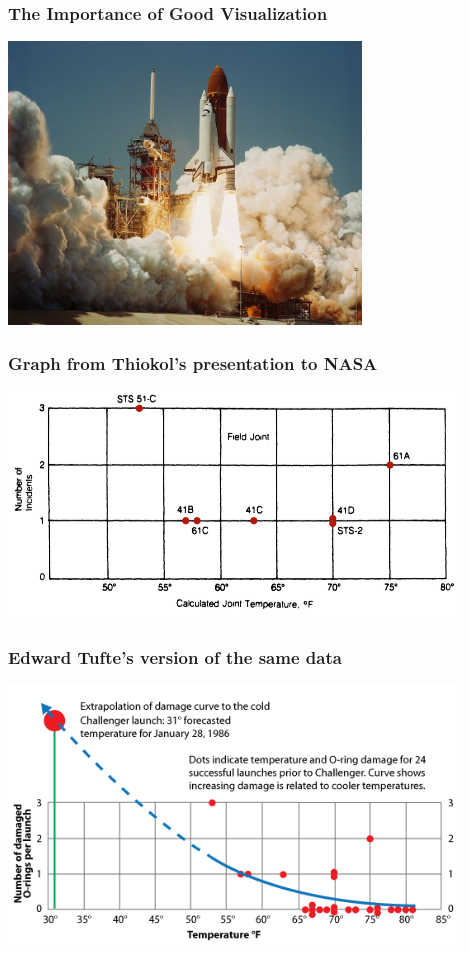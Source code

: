 \documentclass{beamer} %
\begin{document}
\begin{frame}
  \frametitle{The Importance of Good Visualization}
  \centering
  \includegraphics[height=75mm]{assets/challenger.jpg}
\end{frame}

\begin{frame}
  \frametitle{Graph from Thiokol's presentation to NASA}
  \centering
  \includegraphics[width=120mm]{assets/thiokol-challenger-graph.png}
\end{frame}

\begin{frame}
  \frametitle{Edward Tufte's version of the same data}
  \centering
  \includegraphics[width=120mm]{assets/tufte-challenger-graph.png}
\end{frame}
\end{document}
